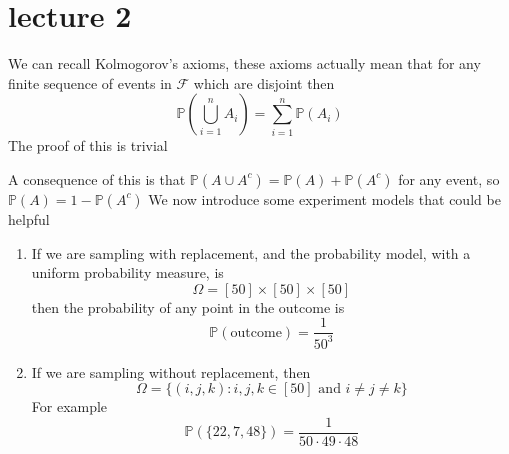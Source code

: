\documentclass{tufte-handout}
\begin{document}
	\section{lecture 2}
	\begin{corollary}
	We can recall Kolmogorov's axioms, these axioms actually mean that for any finite sequence of events in $\mathcal{F}$ which are disjoint then 
	$$\mathbb{P}(\bigcup_{i = 1}^n A_i) = \sum_{i = 1}^n \mathbb{P}(A_i)$$
	The proof of this is trivial
	\end{corollary}
	A consequence of this is that $\mathbb{P}(A \cup A^c) = \mathbb{P}(A) + \mathbb{P}(A^c)$ for any event, so $\mathbb{P}(A) = 1- \mathbb{P}(A^c)$
	We now introduce some experiment models that could be helpful
	\begin{enumerate}
		\item If we are sampling with replacement, and the probability model, with a uniform probability measure, is 
			$$ \Omega = [50]\times [50] \times [50]$$
			then the probability of any point in the outcome is 
			$$\mathbb{P}(\text{outcome}) = \frac{1}{50^3}$$
		\item If we are sampling without replacement, then 
			$$ \Omega = \{(i,j,k) \colon i,j,k \in [50] \text{ and } i\neq j \neq k \} $$
			For example 
			$$ \mathbb{P}(\{22,7,48\}) = \frac{1}{50 \cdot 49 \cdot 48}$$

	\end{enumerate}

	
\end{document}
